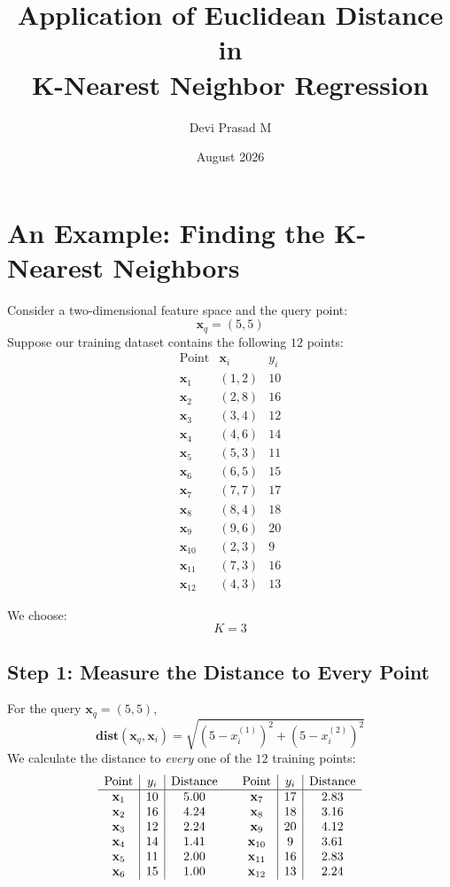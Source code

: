 \documentclass[12pt]{article}
\title{Application of Euclidean Distance \vspace*{4pt}\\ in \vspace*{4pt}\\K-Nearest Neighbor Regression}
\author{Devi Prasad M}
\date{August 2026}
\newcommand{\MVec}[1]{\mathbf{#1}}
\begin{document}
\pagecolor{yellow!25!brown!30}

\maketitle

\section*{An Example: Finding the K-Nearest Neighbors}
Consider a two-dimensional feature space and the query point:
\[
    \MVec{x}_q = (5,5)
\]
Suppose our training dataset contains the following $12$ points:
\[
    \begin{array}{c|c|c}
        \text{Point} & \MVec{x}_i & y_i \\ \hline
        \MVec{x}_1 & (1,2) & 10 \\
        \MVec{x}_2 & (2,8) & 16 \\
        \MVec{x}_3 & (3,4) & 12 \\
        \MVec{x}_4 & (4,6) & 14 \\
        \MVec{x}_5 & (5,3) & 11 \\
        \MVec{x}_6 & (6,5) & 15 \\
        \MVec{x}_7 & (7,7) & 17 \\
        \MVec{x}_8 & (8,4) & 18 \\
        \MVec{x}_9 & (9,6) & 20 \\
        \MVec{x}_{10} & (2,3) & 9 \\
        \MVec{x}_{11} & (7,3) & 16 \\
        \MVec{x}_{12} & (4,3) & 13
    \end{array}
\]

We choose:
\[
    K = 3
\]

\subsection*{Step 1: Measure the Distance to Every Point}
For the query $\MVec{x}_q=(5,5)$,
\[
    \mathbf{dist}(\MVec{x}_q,\MVec{x}_i) =
    \sqrt{
        (5-x_i^{(1)})^2+
        (5-x_i^{(2)})^2
    }
\]
We calculate the distance to \textit{every} one of the $12$ training points:
\[
    \begin{array}{c|c|c@{\qquad}c|c|c}
        \text{Point} & y_i & \text{Distance}
        & \text{Point} & y_i & \text{Distance} \\ \hline
        \MVec{x}_1 & 10 & 5.00 & \MVec{x}_7 & 17 & 2.83 \\
        \MVec{x}_2 & 16 & 4.24 & \MVec{x}_8 & 18 & 3.16 \\
        \MVec{x}_3 & 12 & 2.24 & \MVec{x}_9 & 20 & 4.12 \\
        \MVec{x}_4 & 14 & 1.41 & \MVec{x}_{10} & 9 & 3.61 \\
        \MVec{x}_5 & 11 & 2.00 & \MVec{x}_{11} & 16 & 2.83 \\
        \MVec{x}_6 & 15 & 1.00 & \MVec{x}_{12} & 13 & 2.24
    \end{array}
\]
\end{document}
